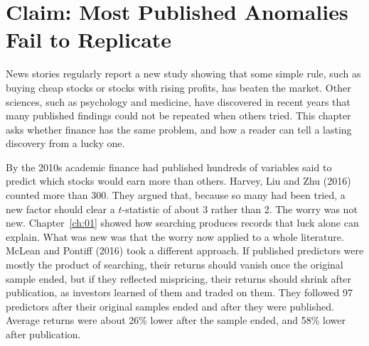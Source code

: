 \makeatletter
{}
\makeatother

\makeatletter
\makeatother

\chapter{Claim: Most Published Anomalies Fail to Replicate}
\label{ch:19}

News stories regularly report a new study showing that some simple rule, such as buying cheap stocks or stocks with rising profits, has beaten the market. Other sciences, such as psychology and medicine, have discovered in recent years that many published findings could not be repeated when others tried. This chapter asks whether finance has the same problem, and how a reader can tell a lasting discovery from a lucky one.

By the 2010s academic finance had published hundreds of variables said to predict which stocks would earn more than others. Harvey, Liu and Zhu (2016) counted more than 300. They argued that, because so many had been tried, a new factor should clear a $t$-statistic of about 3 rather than 2. The worry was not new. Chapter~\ref{ch:01} showed how searching produces records that luck alone can explain. What was new was that the worry now applied to a whole literature. McLean and Pontiff (2016) took a different approach. If published predictors were mostly the product of searching, their returns should vanish once the original sample ended, but if they reflected mispricing, their returns should shrink after publication, as investors learned of them and traded on them. They followed 97 predictors after their original samples ended and after they were published. Average returns were about 26\% lower after the sample ended, and 58\% lower after publication.

